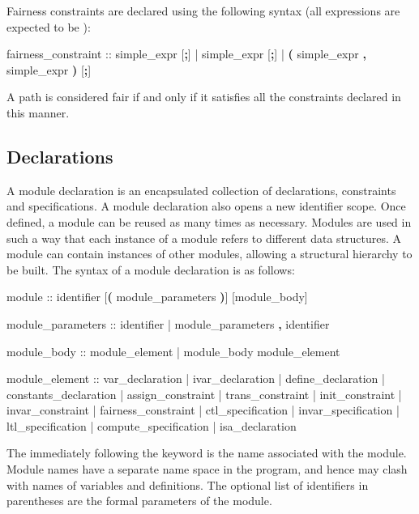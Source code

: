 Fairness constraints are declared using the following syntax (all
expressions are expected to be \Boolean):
%
\begin{Grammar}
fairness_constraint ::
        simple_expr [\textbf{;}]
     |  simple_expr [\textbf{;}]
     |  \textbf{(} simple_expr \textbf{,} simple_expr \textbf{)} [\textbf{;}]
\end{Grammar}
%
A path is considered fair if and only if it satisfies all the
constraints declared in this manner.


\subsection { Declarations}
\label{MODULE Declarations}
%
A module declaration is an encapsulated collection of declarations,
constraints and specifications. 
%
A module declaration also opens a new
identifier scope.
%
Once defined, a module can be reused as many times as
necessary. 
%
Modules are used in such a way that each instance of a module refers to
different data structures. 
%
A module can contain instances of other modules, allowing a structural
hierarchy to be built. 
%
The syntax of a module declaration is as follows:
%
\begin{Grammar}
module ::  identifier [\textbf{(} module_parameters \textbf{)}] [module_body]

module_parameters ::
          identifier
        | module_parameters \textbf{,} identifier

module_body :: 
          module_element 
        | module_body module_element
           
module_element ::
          var_declaration
        | ivar_declaration
        | define_declaration
        | constants_declaration
        | assign_constraint
        | trans_constraint
        | init_constraint
        | invar_constraint
        | fairness_constraint
        | ctl_specification
        | invar_specification
        | ltl_specification
        | compute_specification
        | isa_declaration
\end{Grammar}
%
The  immediately following the keyword
 is the name associated with the module. 
%
Module names have a separate name space in the program, and hence may
clash with names of variables and definitions. 
%
The optional list of identifiers in parentheses are the formal
parameters of the module.

